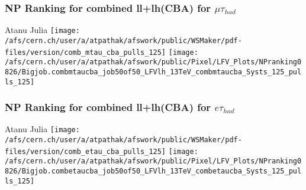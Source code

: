 \documentclass{beamer}
\begin{document}
\begin{frame}
\frametitle{NP Ranking for combined ll+lh(CBA) for $\mu\tau_{had}$}
\begin{normalsize}
\hspace{1.2in} Atanu
\hspace{1.5in} Julia
\vspace*{0.2cm}
\texttt{[image: /afs/cern.ch/user/a/atpathak/afswork/public/WSMaker/pdf-files/version/comb\_mtau\_cba\_pulls\_125]}
\texttt{[image: /afs/cern.ch/user/a/atpathak/afswork/public/Pixel/LFV\_Plots/NPranking0826/Bigjob.combmtaucba\_job50of50\_LFVlh\_13TeV\_combmtaucba\_Systs\_125\_pulls\_125]}
\end{normalsize}
\end{frame}
\begin{frame}
\frametitle{NP Ranking for combined ll+lh(CBA) for $e\tau_{had}$}
\begin{normalsize}
\hspace{1.2in} Atanu
\hspace{1.5in} Julia
\vspace*{0.2cm}
\texttt{[image: /afs/cern.ch/user/a/atpathak/afswork/public/WSMaker/pdf-files/version/comb\_etau\_cba\_pulls\_125]}
\texttt{[image: /afs/cern.ch/user/a/atpathak/afswork/public/Pixel/LFV\_Plots/NPranking0826/Bigjob.combetaucba\_job50of50\_LFVlh\_13TeV\_combetaucba\_Systs\_125\_pulls\_125]}
\end{normalsize}
\end{frame}
\end{document}
